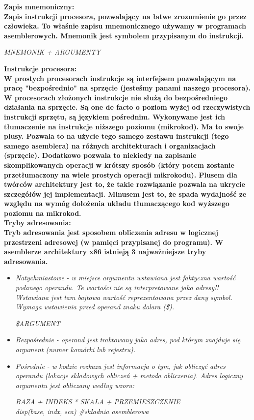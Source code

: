 \documentclass[a4paper,12pt]{article}
\newcommand{\h}[1]{\noindent \bf #1 \rm \\ \noindent}
\newcommand{\italic}[1]{\it #1 \rm}
\begin{document}
\h{Zapis mnemoniczny:}
Zapis instrukcji procesora, pozwalający na łatwe zrozumienie go przez człowieka. To właśnie zapisu mnemonicznego używamy w programach asemblerowych. Mnemonik jest symbolem przypisanym do instrukcji.

\begin{center}
	\it
	MNEMONIK + ARGUMENTY
\end{center}

\h{Instrukcje procesora:}
W prostych procesorach instrukcje są interfejsem pozwalającym na pracę "bezpośrednio" na sprzęcie (jesteśmy panami naszego procesora).\\

\noindent
W procesorach złożonych instrukcje nie służą do bezpośredniego działania na sprzęcie. Są one de facto o poziom wyżej od rzeczywistych instrukcji sprzętu, są językiem pośrednim. Wykonywane jest ich tłumaczenie na instrukcje niższego poziomu (mikrokod). Ma to swoje plusy. Pozwala to na użycie tego samego zestawu instrukcji (tego samego asemblera) na różnych architekturach i organizacjach (sprzęcie). Dodatkowo pozwala to niekiedy na zapisanie skomplikowanych operacji w krótszy sposób (który potem zostanie przetłumaczony na wiele prostych operacji mikrokodu). Plusem dla twórców architektury jest to, że takie rozwiązanie pozwala na ukrycie szczegółów jej implementacji. Minusem jest to, że spada wydajność ze względu na wymóg dołożenia układu tłumaczącego kod wyższego poziomu na mikrokod.\\

\h{Tryby adresowania:}
Tryb adresowania jest sposobem obliczenia adresu w logicznej przestrzeni adresowej (w pamięci przypisanej do programu). W asemblerze architektury x86 istnieją 3 najważniejsze tryby adresowania.
\begin{itemize}
	\item \italic{Natychmiastowe} - w miejsce argumentu wstawiana jest faktyczna wartość podanego operandu. Te wartości nie są interpretowane jako adresy!! Wstawiana jest tam bajtowa wartość reprezentowana przez dany symbol. Wymaga wstawienia przed operand znaku dolara (\$).
	\begin{center}
		\it
		\$ARGUMENT
	\end{center}

	\item \italic{Bezpośrednie} - operand jest traktowany jako adres, pod którym znajduje się argument (numer komórki lub rejestru).
	
	\item \italic{Pośrednie} - w kodzie rozkazu jest informacja o tym, jak obliczyć adres operandu (lokacje składowych obliczeń + metoda obliczenia). Adres logiczny argumentu jest obliczany według wzoru:
	\begin{center}
		\it \small
		BAZA + INDEKS * SKALA + PRZEMIESZCZENIE \\
		disp(base, indx, sca) \#składnia asemblerowa
	\end{center}
\end{itemize}
\vspace{5mm}
\end{document}
